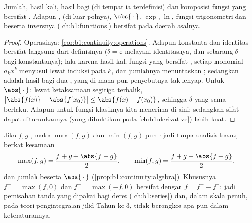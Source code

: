 \begin{proposition}\label{prop:b1:continuity:algebra}
Jumlah, hasil kali, hasil bagi (di tempat ia terdefinisi) dan komposisi
fungsi yang  bersifat . Adapun , 
(di luar polnya), $\abs{\,\cdot\,}$, $\exp$, $\ln$, fungsi
trigonometri dan  beserta inversnya
(\cref{ch:b1:functions}) bersifat  pada daerah asalnya.
\end{proposition}

\begin{proof}
Operasinya: \cref{cor:b1:continuity:operations}. Adapun konstanta dan
identitas bersifat  langsung dari definisinya
($\delta = \varepsilon$ melayani identitasnya, dan sebarang $\delta$ bagi
konstantanya); lalu karena hasil kali fungsi yang  bersifat ,
setiap monomial $a_k x^k$ menyusul lewat induksi pada $k$, dan jumlahnya
menuntaskan ; sedangkan  adalah hasil bagi dua
, yang  di mana pun penyebutnya tak
lenyap. Untuk $\abs{\,\cdot\,}$: lewat ketaksamaan segitiga terbalik,
$\bigl|\abs{f(x)} - \abs{f(x_0)}\bigr| \leq \abs{f(x) -
f(x_0)}$, sehingga $\delta$ yang sama berlaku. Adapun untuk fungsi
klasiknya kita menerima  di sini; sedangkan sifat dapat diturunkannya (yang dibuktikan pada
\cref{ch:b1:derivative}) lebih kuat.
\end{proof}

\begin{example}\label{ex:b1:continuity:maxmin}
Jika $f, g$ , maka $\max(f, g)$ dan $\min(f, g)$ pun :
jadi tanpa analisis kasus, berkat kesamaan
\[
\max(f, g) = \frac{f + g + \abs{f - g}}{2},
\qquad
\min(f, g) = \frac{f + g - \abs{f - g}}{2},
\]
dan  jumlah beserta $\abs{\,\cdot\,}$
(\cref{prop:b1:continuity:algebra}). Khususnya $f^+ =
\max(f, 0)$ dan $f^- = \max(-f, 0)$ bersifat  dengan $f =
f^+ - f^-$: jadi pemisahan tanda yang dipakai bagi deret
(\cref{ch:b1:series}) dan, dalam skala penuh, pada teori
pengintegralan jilid Tahun ke-3, tidak berongkos apa pun dalam keteraturannya.
\end{example}

